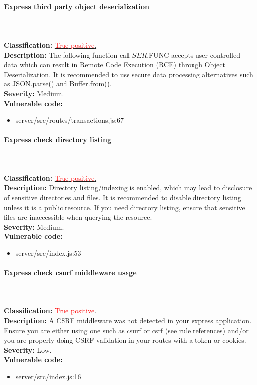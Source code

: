 \documentclass[]{article}
\begin{document}
\paragraph{Express third party object deserialization} \mbox{} \\ \\
\textbf{Classification:} \hyperref[subsubsec:deserialization_of_untrusted_data]{\textcolor{red}{True} \textcolor{red}{positive}.} \\ 
\textbf{Description:} The following function call $SER.$FUNC accepts user controlled data which 
can result in Remote Code Execution (RCE) through Object Deserialization. It is recommended to 
use secure data processing alternatives such as JSON.parse() and Buffer.from(). \\ 
\textbf{Severity:} Medium. \\ 
\textbf{Vulnerable code:} 
\begin{itemize}
    \item server/src/routes/transactions.js:67
\end{itemize}

\paragraph{Express check directory listing} \mbox{} \\ \\
\textbf{Classification:} \hyperref[subsubsec:exposure_of_information_through_directory_listing]{\textcolor{red}{True} \textcolor{red}{positive}.} \\ 
\textbf{Description:} Directory listing/indexing is enabled, which may lead to disclosure of sensitive directories 
and files. It is recommended to disable directory listing unless it is a public resource. If you need directory listing, 
ensure that sensitive files are inaccessible when querying the resource. \\ 
\textbf{Severity:} Medium. \\ 
\textbf{Vulnerable code:} 
\begin{itemize}
    \item server/src/index.js:53
\end{itemize}

\paragraph{Express check csurf middleware usage} \mbox{} \\ \\
\textbf{Classification:} \hyperref[subsubsec:csrf_with_samesite_none_misconfiguration]{\textcolor{red}{True} \textcolor{red}{positive}.} \\ 
\textbf{Description:} A CSRF middleware was not detected in your express application. Ensure you are either using 
one such as csurf or csrf (see rule references) and/or you are properly doing CSRF validation in your routes with 
a token or cookies.\\ 
\textbf{Severity:} Low. \\ 
\textbf{Vulnerable code:} 
\begin{itemize}
    \item server/src/index.js:16
\end{itemize}
\end{document}
